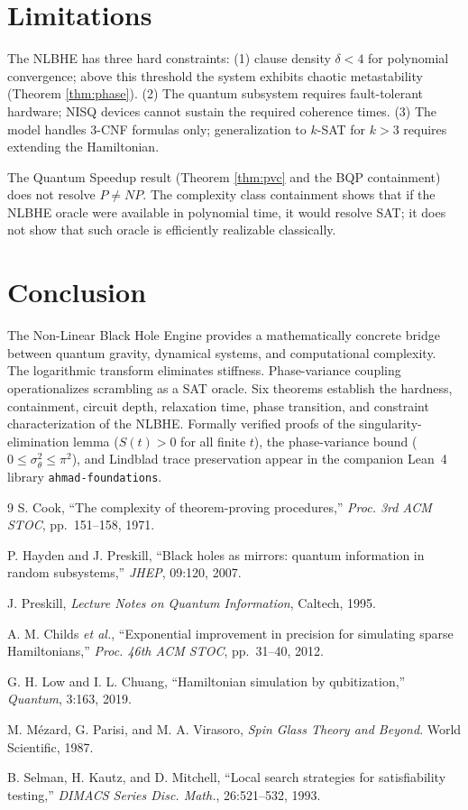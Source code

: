 \documentclass[11pt,letterpaper]{article}
\begin{document}
\section{Limitations}
\label{sec:limits}

The NLBHE has three hard constraints: (1) clause density $\delta < 4$ for polynomial
convergence; above this threshold the system exhibits chaotic metastability (Theorem
\ref{thm:phase}). (2) The quantum subsystem requires fault-tolerant hardware; NISQ devices
cannot sustain the required coherence times. (3) The model handles 3-CNF formulas only;
generalization to $k$-SAT for $k > 3$ requires extending the Hamiltonian.

The Quantum Speedup result (Theorem \ref{thm:pvc} and the BQP containment) does not resolve
$P \neq NP$. The complexity class containment shows that if the NLBHE oracle were available in
polynomial time, it would resolve SAT; it does not show that such oracle is efficiently
realizable classically.

\section{Conclusion}
\label{sec:conclusion}

The Non-Linear Black Hole Engine provides a mathematically concrete bridge between quantum
gravity, dynamical systems, and computational complexity. The logarithmic transform
eliminates stiffness. Phase-variance coupling operationalizes scrambling as a SAT oracle.
Six theorems establish the hardness, containment, circuit depth, relaxation time, phase
transition, and constraint characterization of the NLBHE. Formally verified proofs of the
singularity-elimination lemma ($S(t) > 0$ for all finite $t$), the phase-variance bound
($0 \leq \sigma^2_\theta \leq \pi^2$), and Lindblad trace preservation appear in the
companion Lean~4 library \texttt{ahmad-foundations}.

\begin{thebibliography}{9}
S. Cook, ``The complexity of theorem-proving procedures,'' \textit{Proc. 3rd ACM STOC},
pp.\ 151--158, 1971.

P. Hayden and J. Preskill, ``Black holes as mirrors: quantum information in random subsystems,''
\textit{JHEP}, 09:120, 2007.

J. Preskill, \textit{Lecture Notes on Quantum Information}, Caltech, 1995.

A. M. Childs \textit{et al.}, ``Exponential improvement in precision for simulating sparse
Hamiltonians,'' \textit{Proc. 46th ACM STOC}, pp.\ 31--40, 2012.

G. H. Low and I. L. Chuang, ``Hamiltonian simulation by qubitization,''
\textit{Quantum}, 3:163, 2019.

M. M\'{e}zard, G. Parisi, and M. A. Virasoro,
\textit{Spin Glass Theory and Beyond}. World Scientific, 1987.

B. Selman, H. Kautz, and D. Mitchell,
``Local search strategies for satisfiability testing,''
\textit{DIMACS Series Disc. Math.}, 26:521--532, 1993.
\end{thebibliography}
\end{document}
